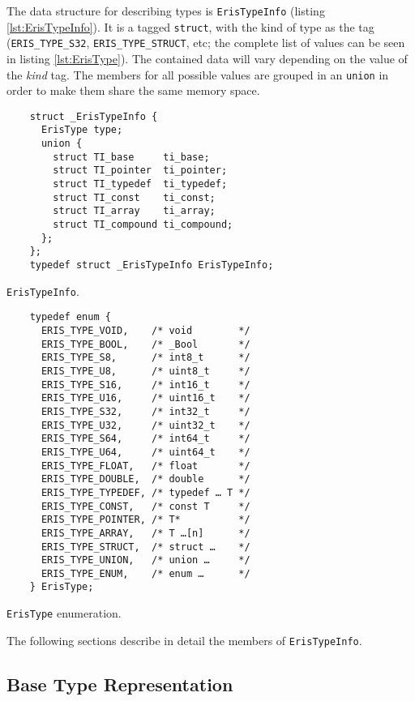 The data structure for describing types is \verb|ErisTypeInfo| (listing
\vref{lst:ErisTypeInfo}). It is a tagged \texttt{struct}, with the kind
of type as the tag (\verb|ERIS_TYPE_S32|, \verb|ERIS_TYPE_STRUCT|, etc; the
complete list of values can be seen in listing \vref{lst:ErisType}). The
contained data will vary depending on the value of the \emph{kind} tag. The
members for all possible values are grouped in an \texttt{union} in
order to make them share the same memory space.

\begin{listing}[h]
  \begin{verbatim}
    struct _ErisTypeInfo {
      ErisType type;
      union {
        struct TI_base     ti_base;
        struct TI_pointer  ti_pointer;
        struct TI_typedef  ti_typedef;
        struct TI_const    ti_const;
        struct TI_array    ti_array;
        struct TI_compound ti_compound;
      };
    };
    typedef struct _ErisTypeInfo ErisTypeInfo;
  \end{verbatim}
  \caption{\texttt{ErisTypeInfo}.}
  \label{lst:ErisTypeInfo}
\end{listing}

\begin{listing}[f]
  \centering
  \begin{verbatim}
    typedef enum {
      ERIS_TYPE_VOID,    /* void        */
      ERIS_TYPE_BOOL,    /* _Bool       */
      ERIS_TYPE_S8,      /* int8_t      */
      ERIS_TYPE_U8,      /* uint8_t     */
      ERIS_TYPE_S16,     /* int16_t     */
      ERIS_TYPE_U16,     /* uint16_t    */
      ERIS_TYPE_S32,     /* int32_t     */
      ERIS_TYPE_U32,     /* uint32_t    */
      ERIS_TYPE_S64,     /* int64_t     */
      ERIS_TYPE_U64,     /* uint64_t    */
      ERIS_TYPE_FLOAT,   /* float       */
      ERIS_TYPE_DOUBLE,  /* double      */
      ERIS_TYPE_TYPEDEF, /* typedef … T */
      ERIS_TYPE_CONST,   /* const T     */
      ERIS_TYPE_POINTER, /* T*          */
      ERIS_TYPE_ARRAY,   /* T …[n]      */
      ERIS_TYPE_STRUCT,  /* struct …    */
      ERIS_TYPE_UNION,   /* union …     */
      ERIS_TYPE_ENUM,    /* enum …      */
    } ErisType;
  \end{verbatim}
  \caption{\texttt{ErisType} enumeration.}
  \label{lst:ErisType}
\end{listing}

\noindent
The following sections describe in detail the members of \verb|ErisTypeInfo|.


\subsection{Base Type Representation}

